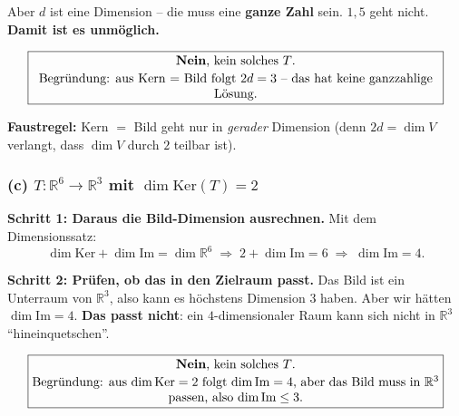 \documentclass[a4paper,12pt]{article}
\begin{document}
Aber $d$ ist eine Dimension -- die muss eine \textbf{ganze Zahl} sein. $1{,}5$ geht nicht. \textbf{Damit ist es unm\"oglich.}

\[
\fbox{\parbox{0.93\textwidth}{\centering
\textbf{Nein}, kein solches $T$. \\[2pt]
Begr\"undung: aus Kern $=$ Bild folgt $2d = 3$ -- das hat keine ganzzahlige L\"osung.
}}
\]

\textbf{Faustregel:} Kern $=$ Bild geht nur in \emph{gerader} Dimension (denn $2d = \dim V$ verlangt, dass $\dim V$ durch $2$ teilbar ist).

\subsubsection*{(c) $T \colon \mathbb{R}^6 \to \mathbb{R}^3$ mit $\dim \text{Ker}(T) = 2$}

\textbf{Schritt 1: Daraus die Bild-Dimension ausrechnen.} Mit dem Dimensionssatz:
\[
\dim \text{Ker} + \dim \text{Im} = \dim \mathbb{R}^6
\;\Rightarrow\; 2 + \dim \text{Im} = 6
\;\Rightarrow\; \dim \text{Im} = 4.
\]

\textbf{Schritt 2: Pr\"ufen, ob das in den Zielraum passt.} Das Bild ist ein Unterraum von $\mathbb{R}^3$, also kann es h\"ochstens Dimension $3$ haben. Aber wir h\"atten $\dim \text{Im} = 4$. \textbf{Das passt nicht}: ein $4$-dimensionaler Raum kann sich nicht in $\mathbb{R}^3$ ``hineinquetschen''.

\[
\fbox{\parbox{0.93\textwidth}{\centering
\textbf{Nein}, kein solches $T$. \\[2pt]
Begr\"undung: aus $\dim \text{Ker} = 2$ folgt $\dim \text{Im} = 4$, aber das Bild muss in $\mathbb{R}^3$ passen, also $\dim \text{Im} \leq 3$.
}}
\]
\end{document}
